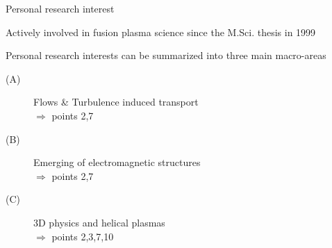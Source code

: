 \documentclass[t,10pt]{beamer}
\begin{document}
\begin{frame}{Personal research interest}
\begin{itemize}
{\large\item Actively involved in fusion plasma science since the
M.Sci. thesis in 1999
\item Personal research interests can be summarized into three main
  macro-areas
\begin{description}
\item[(A)] \textcolor{taorange}{Flows \& Turbulence induced transport \\
    $\Rightarrow$ points 2,7}
\item[(B)]\textcolor{ta3chameleon}{Emerging of electromagnetic
    structures  \\
 $\Rightarrow$ points 2,7}
\item[(C)] \textcolor{tascarletred}{3D physics and helical plasmas \\
    $\Rightarrow$ points 2,3,7,10}
\end{description}
}\end{itemize}
\end{frame}
\end{document}
